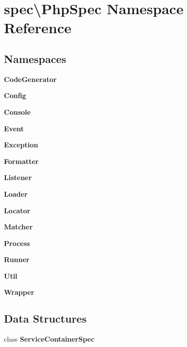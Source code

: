 \section{spec\textbackslash{}Php\+Spec Namespace Reference}
\label{namespacespec_1_1_php_spec}
\subsection*{Namespaces}
\begin{DoxyCompactItemize}
\item 
 {\bf Code\+Generator}
\item 
 {\bf Config}
\item 
 {\bf Console}
\item 
 {\bf Event}
\item 
 {\bf Exception}
\item 
 {\bf Formatter}
\item 
 {\bf Listener}
\item 
 {\bf Loader}
\item 
 {\bf Locator}
\item 
 {\bf Matcher}
\item 
 {\bf Process}
\item 
 {\bf Runner}
\item 
 {\bf Util}
\item 
 {\bf Wrapper}
\end{DoxyCompactItemize}
\subsection*{Data Structures}
\begin{DoxyCompactItemize}
\item 
class {\bf Service\+Container\+Spec}
\end{DoxyCompactItemize}
